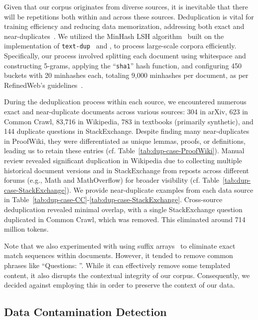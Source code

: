 Given that our corpus originates from diverse sources, it is inevitable that there will be repetitions both within and across these sources. Deduplication is vital for training efficiency and reducing data memorization, addressing both exact and near-duplicates~\citep{lee-etal-2022-deduplicating}. We utilized the MinHash LSH algorithm~\citep{DBLP:conf/vldb/GionisIM99-LSH} built on the implementation of \texttt{text-dup}~\citep{chenghao_mou_2023_8364980_text-dedup} and \citet{lee-etal-2022-deduplicating}, to process large-scale corpora efficiently. Specifically, our process involved splitting each document using whitespace and constructing 5-grams, applying the ``\texttt{sha1}'' hash function, and configuring 450 buckets with 20 minhashes each, totaling 9,000 minhashes per document, as per RefinedWeb's guidelines~\citep{DBLP:journals/corr/abs-2306-01116-refinedweb}.

During the deduplication process within each source, we encountered numerous exact and near-duplicate documents across various sources: 304 in arXiv, 623 in Common Crawl, 83,716 in Wikipedia, 783 in textbooks (primarily synthetic), and 144 duplicate questions in StackExchange. Despite finding many near-duplicates in ProofWiki, they were differentiated as unique lemmas, proofs, or definitions, leading us to retain these entries (cf. Table~\ref{tab:dup-case-ProofWiki}). Manual review revealed significant duplication in Wikipedia due to collecting multiple historical document versions and in StackExchange from reposts across different forums (e.g., Math and MathOverflow) for broader visibility (cf. Table~\ref{tab:dup-case-StackExchange}). We provide near-duplicate examples from each data source in Table~\ref{tab:dup-case-CC}-\ref{tab:dup-case-StackExchange}. Cross-source deduplication revealed minimal overlap, with a single StackExchange question duplicated in Common Crawl, which was removed. This eliminated around 714 million tokens.

Note that we also experimented with using suffix arrays~\citep{DBLP:journals/siamcomp/ManberM93-suffix-arrays} to eliminate exact match sequences within documents. However, it tended to remove common phrases like ``Questions: ''. While it can effectively remove some templated content, it also disrupts the contextual integrity of our corpus. Consequently, we decided against employing this in order to preserve the context of our data.

\subsection{Data Contamination Detection}
\label{sec:data-contamination-detection}

